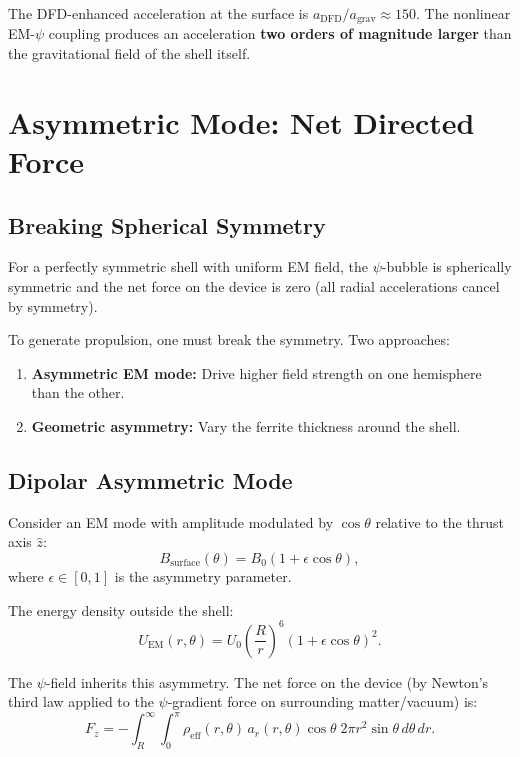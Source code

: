 \documentclass[amsmath,amssymb,aps,prd,superscriptaddress,nofootinbib]{revtex4-2}
\begin{document}
The DFD-enhanced acceleration at the surface is
$a_\text{DFD}/a_\text{grav} \approx 150$. The nonlinear EM-$\psi$
coupling produces an acceleration \textbf{two orders of magnitude larger}
than the gravitational field of the shell itself.

\section{Asymmetric Mode: Net Directed Force}\label{sec:asymmetric}

\subsection{Breaking Spherical Symmetry}

For a perfectly symmetric shell with uniform EM field, the $\psi$-bubble
is spherically symmetric and the net force on the device is zero (all
radial accelerations cancel by symmetry).

To generate propulsion, one must break the symmetry. Two approaches:

\begin{enumerate}
\item \textbf{Asymmetric EM mode:} Drive higher field strength on one
  hemisphere than the other.
\item \textbf{Geometric asymmetry:} Vary the ferrite thickness around the shell.
\end{enumerate}

\subsection{Dipolar Asymmetric Mode}

Consider an EM mode with amplitude modulated by $\cos\theta$ relative to
the thrust axis $\hat{z}$:
\begin{equation}
B_\text{surface}(\theta) = B_0(1 + \epsilon \cos\theta),
\end{equation}
where $\epsilon \in [0,1]$ is the asymmetry parameter.

The energy density outside the shell:
\begin{equation}
U_\text{EM}(r, \theta) = U_0 \left(\frac{R}{r}\right)^6 (1 + \epsilon\cos\theta)^2.
\end{equation}

The $\psi$-field inherits this asymmetry. The net force on the device
(by Newton's third law applied to the $\psi$-gradient force on
surrounding matter/vacuum) is:
\begin{equation}
F_z = -\int_R^\infty \int_0^\pi \rho_\text{eff}(r,\theta) \, a_r(r,\theta)
\cos\theta \; 2\pi r^2 \sin\theta \, d\theta \, dr.
\end{equation}
\end{document}
